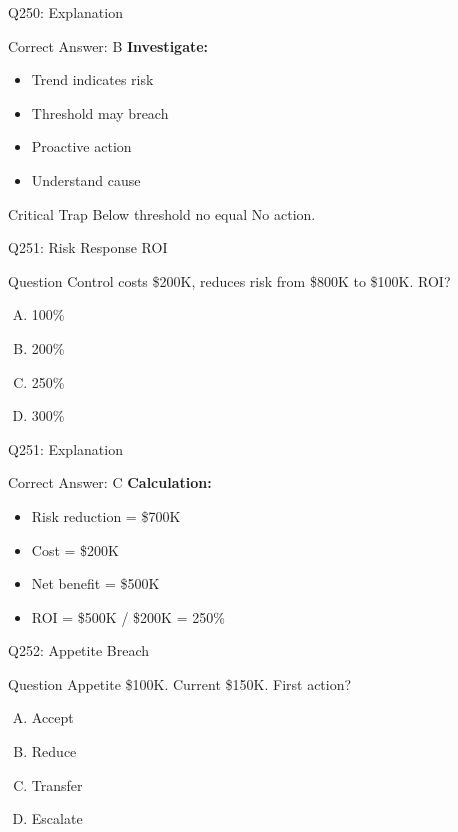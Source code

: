 \documentclass{beamer}
\begin{document}
	\begin{frame}{Q250: Explanation}
		\begin{block}{Correct Answer: B}
			\textbf{Investigate:}
			\begin{itemize}
				\item Trend indicates risk
				\item Threshold may breach
				\item Proactive action
				\item Understand cause
			\end{itemize}
		\end{block}
		\begin{alertblock}{Critical Trap}
			Below threshold no equal No action.
		\end{alertblock}
	\end{frame}
	
	
	\begin{frame}{Q251: Risk Response ROI}
		\begin{block}{Question}
			Control costs \$200K, reduces risk from \$800K to \$100K. ROI?
		\end{block}
		\begin{enumerate}[(A)]
			\item 100\%
			\item 200\%
			\item 250\%
			\item 300\%
		\end{enumerate}
	\end{frame}
	
	\begin{frame}{Q251: Explanation}
		\begin{block}{Correct Answer: C}
			\textbf{Calculation:}
			\begin{itemize}
				\item Risk reduction = \$700K
				\item Cost = \$200K
				\item Net benefit = \$500K
				\item ROI = \$500K / \$200K = 250\%
			\end{itemize}
		\end{block}
	\end{frame}
	
	\begin{frame}{Q252: Appetite Breach}
		\begin{block}{Question}
			Appetite \$100K. Current \$150K. First action?
		\end{block}
		\begin{enumerate}[(A)]
			\item Accept
			\item Reduce
			\item Transfer
			\item Escalate
		\end{enumerate}
	\end{frame}
	
\end{document}
